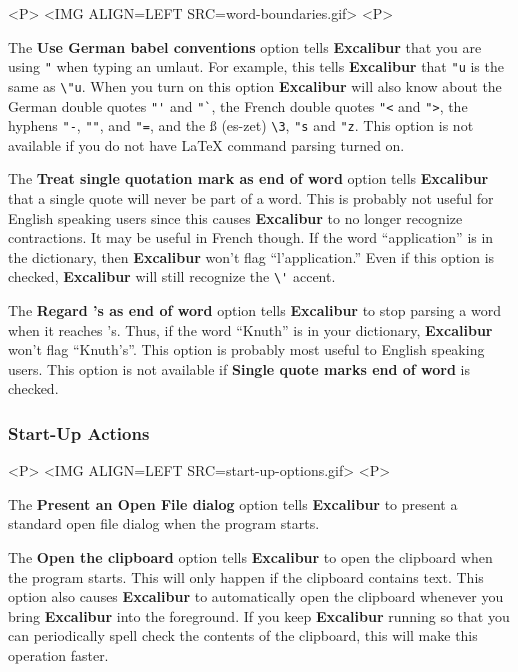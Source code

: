 ﻿\documentclass[11pt,titlepage]{article}
\newcommand{\ex}{\textbf{Excalibur}}
\begin{document}
\begin{rawhtml}
<P>
<IMG ALIGN=LEFT SRC=word-boundaries.gif>
<P>
\end{rawhtml}

The \textbf{Use German babel conventions} option tells \ex{} that you
are using \texttt{"} when typing an umlaut.  For example, this tells
\ex{} that \verb+"u+ is the same as \verb+\"u+.  When you turn on this
option \ex{} will also know about the German double quotes \verb+"'+
and \verb+"`+, the French double quotes \verb+"<+ and \verb+">+, the
hyphens \verb+"-+, \verb+""+, and \verb+"=+, and the \ss{} (es-zet)
\verb+\3+, \verb+"s+ and \verb+"z+.  This option is not available if
you do not have \LaTeX{} command parsing turned on.

The \textbf{Treat single quotation mark as end of word} option tells
\ex{} that a single quote will never be part of a word. This is
probably not useful for English speaking users since this causes \ex{}
to no longer recognize contractions. It may be useful in French
though. If the word ``application'' is in the dictionary, then \ex{}
won't flag ``l'application.'' Even if this option is checked, \ex{}
will still recognize the \verb+\'+ accent.

The \textbf{Regard 's as end of word} option tells \ex{} to stop
parsing a word when it reaches 's.  Thus, if the word ``Knuth'' is in
your dictionary, \ex{} won't flag ``Knuth's''.  This option is
probably most useful to English speaking users.  This option is not
available if \textbf{Single quote marks end of word} is checked.

\subsubsection{Start-Up Actions}
\label{sec:start-up-actions}

\begin{rawhtml}
<P>
<IMG ALIGN=LEFT SRC=start-up-options.gif>
<P>
\end{rawhtml}

The \textbf{Present an Open File dialog} option tells \ex{} to present
a standard open file dialog when the program starts.

The \textbf{Open the clipboard} option tells \ex{} to open the
clipboard when the program starts.  This will only happen if the
clipboard contains text.  This option also causes \ex{} to
automatically open the clipboard whenever you bring \ex{} into the
foreground.  If you keep \ex{} running so that you can periodically
spell check the contents of the clipboard, this will make this
operation faster.
\end{document}
